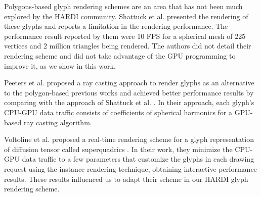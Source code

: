 \documentclass[twoside,twocolumn,10pt]{article}
\begin{document}






Polygons-based glyph rendering schemes are an area that has not been much explored by the HARDI community. Shattuck et al. \cite{shattuck2008} presented the rendering of these glyphs and reports a limitation in the rendering performance. The performance result reported by them were 10 FPS for a spherical mesh of 225 vertices and 2 million triangles being rendered. The authors did not detail their rendering scheme and did not take advantage of the GPU programming to improve it, as we show in this work.



Peeters et al. \cite{peeters2009} proposed a ray casting approach to render glyphs as an alternative to the polygon-based previous works and achieved better performance results by comparing with the approach of Shattuck et al. \cite{shattuck2008}. In their approach, each glyph's CPU-GPU data traffic consists of coefficients of spherical harmonics for a GPU-based ray casting algorithm.


Voltoline et al. \cite{voltoline2021} proposed a real-time rendering scheme for a glyph representation of diffusion tensor called superquadrics \cite{Kindlmann2004}. In their work, they minimize the CPU-GPU data traffic to a few parameters that customize the glyphs in each drawing request using the instance rendering technique, obtaining interactive performance results. These results influenced us to adapt their scheme in our HARDI glyph rendering scheme.
\end{document}
